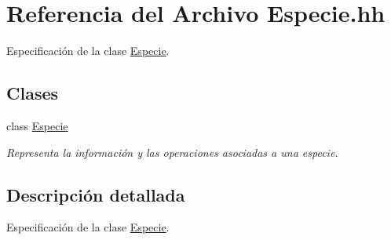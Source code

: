 \hypertarget{_especie_8hh}{}\section{Referencia del Archivo Especie.\+hh}
\label{_especie_8hh}


Especificación de la clase \hyperlink{class_especie}{Especie}.  


\subsection*{Clases}
\begin{DoxyCompactItemize}
\item 
class \hyperlink{class_especie}{Especie}
\begin{DoxyCompactList}\small\item\em Representa la información y las operaciones asociadas a una especie. \end{DoxyCompactList}\end{DoxyCompactItemize}


\subsection{Descripción detallada}
Especificación de la clase \hyperlink{class_especie}{Especie}. 

